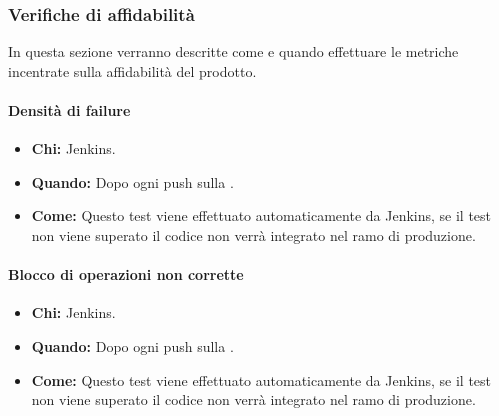 \newpage
\subsubsection{Verifiche di affidabilità}
In questa sezione verranno descritte come e quando effettuare le metriche incentrate sulla affidabilità del prodotto.

\paragraph{Densità di failure}
\begin{itemize}
\item \textbf{Chi:} Jenkins.
\item \textbf{Quando:} Dopo ogni push sulla .
\item \textbf{Come:} Questo test viene effettuato automaticamente da Jenkins, se il test non viene superato il codice non verrà integrato nel ramo di produzione.
\end{itemize}

\paragraph{Blocco di operazioni non corrette}
\begin{itemize}
\item \textbf{Chi:} Jenkins.
\item \textbf{Quando:} Dopo ogni push sulla .
\item \textbf{Come:} Questo test viene effettuato automaticamente da Jenkins, se il test non viene superato il codice non verrà integrato nel ramo di produzione.
\end{itemize}
